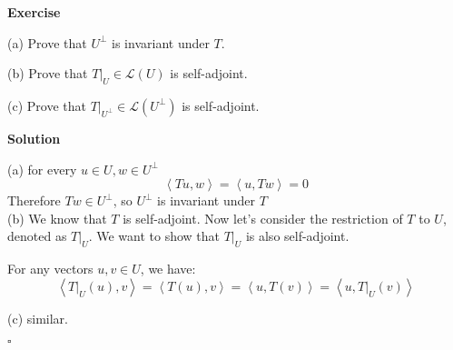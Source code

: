 \documentclass{article}
\newenvironment{exercise}{%
{\textbf{Exercise\\}
    }
}{
}
\newenvironment{solution}{%
{
    \textbf{Solution\\}
    }
}{
  \hfill $\square$ 
  \par\bigskip 
}
\begin{document}
\begin{CJK}{UTF8}{gkai}
\begin{exercise}
    (a) Prove that $U^\bot$ is invariant under $T$.

    (b) Prove that $T|_U \in \mathcal{L}(U)$ is self-adjoint.

    (c) Prove that $T|_{U^\bot} \in \mathcal{L}(U^\bot)$ is self-adjoint.
\end{exercise}

\begin{solution}

    (a) for every $u \in U, w \in U^\bot$
    \[\left<Tu,w\right> = \left<u,Tw\right> = 0\]
    Therefore $Tw \in U^\bot$, so $U^\bot$ is invariant under $T$\\

    (b) We know that $T$ is self-adjoint. Now let's consider the restriction of $T$ to $U$, denoted as $T|_U$. We want to show that $T|_U$ is also self-adjoint.
    
    For any vectors $u, v \in U$, we have:
    \[\left< T|_U(u), v \right> = \left< T(u), v \right>= \left< u, T(v) \right> = \left< u,T|_U(v) \right>\]

    (c) similar.


    







\end{solution}
\end{CJK}
\end{document}
